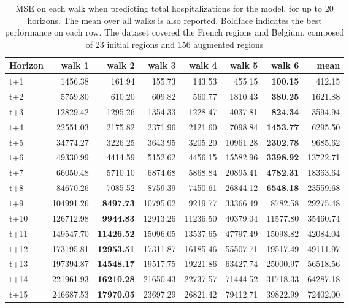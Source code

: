 \begin{table}[H]
\centering
\caption{MSE on each walk when predicting total hospitalizations for the model, for up to 20 horizons. The mean over all walks is also reported. Boldface indicates the best performance on each row. The dataset covered the French regions and Belgium, composed of 23 initial regions and 156 augmented regions }
\label{tab:MSE_walk_baseline}
\begin{tabular}{lrrrrrrr}
\toprule
Horizon &    walk 1 &   walk 2 &   walk 3 &   walk 4 &    walk 5 &    walk 6 &      mean \\
\midrule
t+1  & 1456.38  & 161.94  & 155.73  & 143.53  & 455.15  & \textbf{100.15}  & 412.15  \\
t+2  & 5759.80  & 610.20  & 609.82  & 560.77  & 1810.43  & \textbf{380.25}  & 1621.88  \\
t+3  & 12829.42  & 1295.26  & 1354.33  & 1228.47  & 4037.81  & \textbf{824.34}  & 3594.94  \\
t+4  & 22551.03  & 2175.82  & 2371.96  & 2121.60  & 7098.84  & \textbf{1453.77}  & 6295.50  \\
t+5  & 34774.27  & 3226.25  & 3643.95  & 3205.20  & 10961.28  & \textbf{2302.78}  & 9685.62  \\
t+6  & 49330.99  & 4414.59  & 5152.62  & 4456.15  & 15582.96  & \textbf{3398.92}  & 13722.71  \\
t+7  & 66050.48  & 5710.10  & 6874.68  & 5868.84  & 20895.41  & \textbf{4782.31}  & 18363.64  \\
t+8  & 84670.26  & 7085.52  & 8759.39  & 7450.61  & 26844.12  & \textbf{6548.18}  & 23559.68  \\
t+9  & 104991.26  & \textbf{8497.73}  & 10795.02  & 9219.77  & 33366.49  & 8782.58  & 29275.48  \\
t+10  & 126712.98  & \textbf{9944.83}  & 12913.26  & 11236.50  & 40379.04  & 11577.80  & 35460.74  \\
t+11  & 149547.70  & \textbf{11426.52}  & 15096.05  & 13537.65  & 47797.49  & 15098.82  & 42084.04  \\
t+12  & 173195.81  & \textbf{12953.51}  & 17311.87  & 16185.46  & 55507.71  & 19517.49  & 49111.97  \\
t+13  & 197394.87  & \textbf{14548.17}  & 19517.75  & 19221.86  & 63427.74  & 25000.97  & 56518.56  \\
t+14  & 221961.93  & \textbf{16210.28}  & 21650.43  & 22737.57  & 71444.52  & 31718.33  & 64287.18  \\
t+15  & 246687.53  & \textbf{17970.05}  & 23697.29  & 26821.42  & 79412.71  & 39822.99  & 72402.00  \\

\end{tabular}
\end{table}

